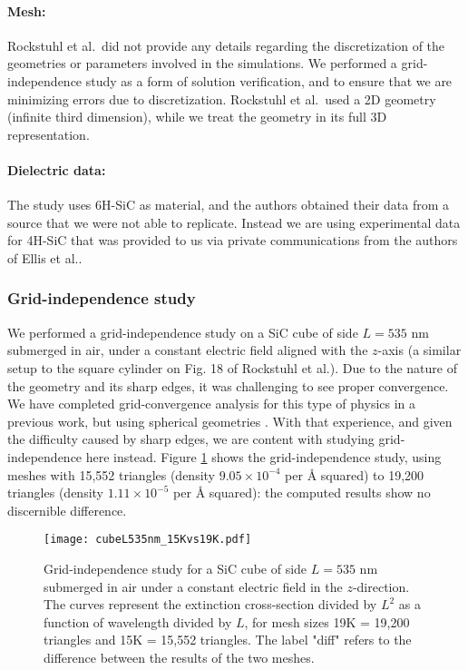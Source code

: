 \paragraph{Mesh:} Rockstuhl et al.\ did not provide any details regarding the discretization of the geometries or 
parameters involved in the simulations.
We performed a grid-independence study as a form of solution verification, and to ensure that we are 
minimizing errors due to discretization. Rockstuhl et al.\ used a 2D geometry (infinite third dimension), while we treat the geometry in its full 3D representation.

\paragraph{Dielectric data:} The study uses 6H-SiC as material, and the authors obtained their data from a source that we
were not able to replicate. Instead we are using experimental data for 4H-SiC that was provided to us 
via private communications from the authors of Ellis et al.\cite{ellis2016}.  

\subsubsection{Grid-independence study}\label{sec:independence}

We performed a grid-independence study on a SiC cube of side $L=535$ nm submerged in air, under a 
constant electric field aligned with the $z$-axis (a similar setup to the square cylinder on Fig. 18 of 
Rockstuhl et al.\cite{rockstuhl2005}). 
Due to the nature of the geometry and its sharp edges, it was challenging to see proper convergence. 
We have completed grid-convergence analysis for this type of physics in a previous work, but using spherical geometries \cite{ClementiETal2019}. 
With that experience, and given the difficulty caused by sharp edges, we are content with studying grid-independence here instead.
Figure \ref{fig:cube535} shows the grid-independence study, using meshes with  15,552 triangles (density $9.05\times10^{-4}$ per $\text{\AA}$ squared)
 to 19,200 triangles (density $1.11\times10^{-5}$ per $\text{\AA}$ squared):
 the computed results show no discernible difference.

\begin{figure}
    \centering
    \texttt{[image: cubeL535nm\_15Kvs19K.pdf]} 
    \caption{Grid-independence study for a SiC cube of side $L=535$ nm submerged in air under a constant 
    electric field in the $z$-direction. The curves represent the extinction cross-section divided by $L^2$ 
    as a function of wavelength divided by $L$, for mesh sizes 19K = 19,200 triangles and 15K = 15,552 triangles. 
    The label "diff" refers to the difference between the results of the two meshes.}
    \label{fig:cube535}
 \end{figure}

